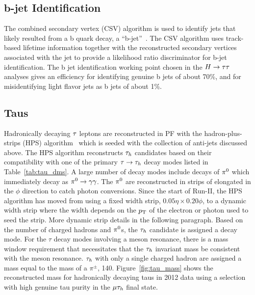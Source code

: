 \subsection{b-jet Identification}
\label{sec:reco_b_jet}
The combined secondary vertex (CSV) algorithm is used to identify jets that likely resulted
from a b quark decay, a ``b-jet''~\cite{CMS:2016kkf, 1748-0221-8-04-P04013}. 
The CSV algorithm uses track-based lifetime information together with 
the reconstructed secondary vertices associated with the jet to provide a likelihood ratio 
discriminator for b-jet identification. The b jet identification working point chosen in the $H\to\tau\tau$ analyses 
gives an efficiency for identifying genuine b jets of about 70\%, and for misidentifying light flavor jets
as b jets of about 1\%.


\subsection{Taus}
\label{sec:obj_reco_tau}
Hadronically decaying $\tau$ leptons are reconstructed in PF with the hadron-plus-strips (HPS)
algorithm~\cite{Khachatryan:2015dfa, CMS-PAS-TAU-16-002} which is seeded with the collection of 
anti-\kt jets discussed above. The HPS algorithm reconstructs $\tau_{h}$ candidates based on their
compatibility with one of the primary $\tau\to\tau_{h}$ decay modes listed in Table~\ref{tab:tau_dms}.
A large number of decay modes include decays of $\pi^{0}$ which immediately decay as 
$\pi^{0}  \to  \gamma\gamma$. The $\pi^{0}$ are
reconstructed in strips of \etaphi elongated in the $\phi$ direction to catch photon conversions.
Since the start of Run-II, the HPS algorithm has moved from using a fixed width strip,
$0.05 \eta \times 0.20 \phi$, to a dynamic width strip where the width depends on the 
$p_\mathrm{T}$ of the electron or photon used to seed the strip. More dynamic strip details in the following paragraph.
Based on the number of
charged hadrons and $\pi^{0}$s, the $\tau_{h}$ candidate is assigned a decay mode. For the $\tau$
decay modes involving a meson resonance, there is a mass window requirement that necessitates
that the $\tau_{h}$ invariant mass be consistent with the meson resonance. $\tau_{h}$ with only a single
charged hadron are assigned a mass equal to the mass of a $\pi^{\pm}$, 140\MeV. Figure~\ref{fig:tau_mass}
shows the reconstructed mass for hadronically decaying taus in 2012 data using a selection with
high genuine tau purity in the $\mu\tau_{h}$ final state.

